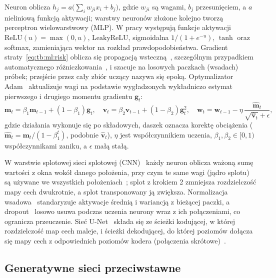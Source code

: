Neuron oblicza $h_j=a\bigl(\sum_{i}w_{ji}x_i+b_j\bigr)$, gdzie $w_{ji}$ są wagami, $b_j$ przesunięciem, a $a$ nieliniową funkcją aktywacji; warstwy neuronów złożone kolejno tworzą perceptron wielowarstwowy (MLP).
W pracy występują funkcje aktywacji $\mathrm{ReLU}(u)=\max(0,u)$, $\mathrm{LeakyReLU}$, sigmoidalna $1/(1+e^{-u})$, $\tanh$ oraz softmax, zamieniająca wektor na rozkład prawdopodobieństwa.
Gradient straty~\eqref{eq:tb:ml:risk} oblicza się propagacją wsteczną~\cite{rumelhart_learning_1986}, szczególnym przypadkiem automatycznego różniczkowania~\cite{goodfellow2016deep}, i szacuje na losowych paczkach (wsadach) próbek; przejście przez cały zbiór uczący nazywa się epoką.
Optymalizator Adam~\cite{kingma2014adam} aktualizuje wagi na podstawie wygładzonych wykładniczo estymat pierwszego i drugiego momentu gradientu $\mathbf{g}_t$:
\begin{equation}\label{eq:tb:ml:adam}
\mathbf{m}_t=\beta_1\mathbf{m}_{t-1}+(1-\beta_1)\mathbf{g}_t,\quad
\mathbf{v}_t=\beta_2\mathbf{v}_{t-1}+(1-\beta_2)\mathbf{g}_t^{2},\quad
\mathbf{w}_t=\mathbf{w}_{t-1}-\eta\,\frac{\hat{\mathbf{m}}_t}{\sqrt{\hat{\mathbf{v}}_t}+\epsilon},
\end{equation}
gdzie działania wykonuje się po składowych, daszek oznacza korektę obciążenia ($\hat{\mathbf{m}}_t=\mathbf{m}_t/(1-\beta_1^{t})$, podobnie $\hat{\mathbf{v}}_t$), $\eta$ jest współczynnikiem uczenia, $\beta_1,\beta_2\in[0,1)$ współczynnikami zaniku, a $\epsilon$ małą stałą.

W warstwie splotowej sieci splotowej (CNN)~\cite{lecun1998gradient} każdy neuron oblicza ważoną sumę wartości z okna wokół danego położenia, przy czym te same wagi (jądro splotu) są używane we wszystkich położeniach~\cite{goodfellow2016deep}; splot z krokiem 2 zmniejsza rozdzielczość mapy cech dwukrotnie, a splot transponowany ją zwiększa.
Normalizacja wsadowa~\cite{ioffe_batch_2015} standaryzuje aktywacje średnią i wariancją z bieżącej paczki, a dropout~\cite{srivastava_dropout_2014} losowo usuwa podczas uczenia neurony wraz z ich połączeniami, co ogranicza przeuczenie.
Sieć U-Net~\cite{ronneberger_u-net_2015} składa się ze ścieżki kodującej, w której rozdzielczość map cech maleje, i ścieżki dekodującej, do której poziomów dołącza się mapy cech z odpowiednich poziomów kodera (połączenia skrótowe)~\cite{isola_image_2017}.

\subsection{Generatywne sieci przeciwstawne}\label{subsec:tb:ml:gan}

